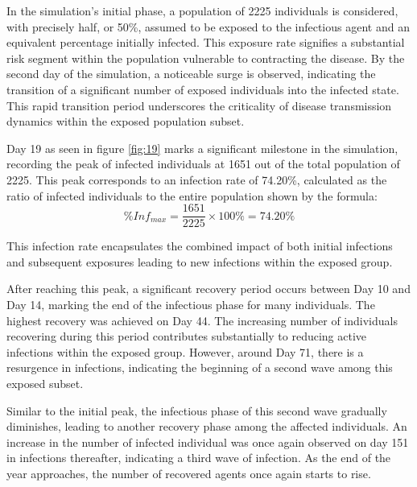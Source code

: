 In the simulation's initial phase, a population of 2225 individuals is considered, with precisely half, or 50\%, assumed to be exposed to the infectious agent and an equivalent percentage initially infected. This exposure rate signifies a substantial risk segment within the population vulnerable to contracting the disease. By the second day of the simulation, a noticeable surge is observed, indicating the transition of a significant number of exposed individuals into the infected state. This rapid transition period underscores the criticality of disease transmission dynamics within the exposed population subset.

Day 19  as seen in figure \ref{fig:19} marks a significant milestone in the simulation, recording the peak of infected individuals at 1651 out of the total population of 2225. This peak corresponds to an infection rate of 74.20\%, calculated as the ratio of infected individuals to the entire population shown by the formula:
\[ \%Inf_{max} = \frac{1651}{2225} \times 100\%  = 74.20\%\]

This infection rate encapsulates the combined impact of both initial infections and subsequent exposures leading to new infections within the exposed group.

After reaching this peak, a significant recovery period occurs between Day 10 and Day 14, marking the end of the infectious phase for many individuals. The highest recovery was achieved on Day 44. The increasing number of individuals recovering during this period contributes substantially to reducing active infections within the exposed group. However, around Day 71, there is a resurgence in infections, indicating the beginning of a second wave among this exposed subset.

Similar to the initial peak, the infectious phase of this second wave gradually diminishes, leading to another recovery phase among the affected individuals. An increase in the number of infected individual was once again observed on day 151 in infections thereafter, indicating a third wave of infection. As the end of the year approaches, the number of recovered agents once again starts to rise. 

